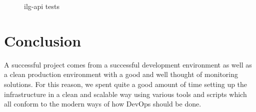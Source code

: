 \begin{figure}[H]
    \centering
    \caption{ilg-api tests}
    \label{fig:ilg-api-tests}
\end{figure}

\setcounter{secnumdepth}{0} %
\section{Conclusion}
A successful project comes from a successful development environment as well as a clean production environment with a good and well thought of monitoring solutions.
For this reason, we spent quite a good amount of time setting up the infrastructure in a clean and scalable way using various tools and scripts which all conform to the modern ways of how DevOps should be done.
